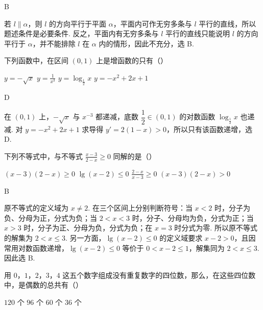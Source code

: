 \begin{answer}
B
\end{answer}

\begin{solution}
若 \(l\parallel\alpha\)，则 \(l\) 的方向平行于平面 \(\alpha\)，平面内可作无穷多条与 \(l\) 平行的直线，所以题述条件是必要条件. 反之，平面内有无穷多条与 \(l\) 平行的直线只能说明 \(l\) 的方向平行于 \(\alpha\)，并不能排除 \(l\) 在 \(\alpha\) 内的情形，因此不充分，选 B.
\end{solution}

\begin{problem}
下列函数中，在区间 \((0,1)\) 上是增函数的只有（\quad）

\choices
    {\(y = -\sqrt{x}\)}
    {\(y = \frac{1}{x^3}\)}
    {\(y = \log_{\frac{1}{2}} x\)}
    {\(y = -x^2 + 2x + 1\)}
\end{problem}

\begin{answer}
D
\end{answer}

\begin{solution}
在 \((0,1)\) 上，\(-\sqrt{x}\) 与 \(x^{-3}\) 都递减，底数 \(\dfrac12\in(0,1)\) 的对数函数 \(\log_{\frac{1}{2}}x\) 也递减. 对 \(y=-x^2+2x+1\) 求导得 \(y'=2(1-x)>0\)，所以只有该函数递增，选 D.
\end{solution}

\begin{problem}
下列不等式中，与不等式 \(\frac{x - 3}{2 - x} \geqslant 0\) 同解的是（\quad）

\choices
    {\((x - 3)(2 - x) \geqslant 0\)}
    {\(\lg(x - 2) \leqslant 0\)}
    {\(\frac{2 - x}{x - 3} \geqslant 0\)}
    {\((x - 3)(2 - x) > 0\)}
\end{problem}

\begin{answer}
B
\end{answer}

\begin{solution}
原不等式的定义域为 \(x\ne2\). 在三个区间上分别判断符号：当 \(x<2\) 时，分子为负、分母为正，分式为负；当 \(2<x<3\) 时，分子、分母均为负，分式为正；当 \(x>3\) 时，分子为正、分母为负，分式为负；在 \(x=3\) 时分式为零. 所以原不等式的解集为 \(2<x\leqslant3\). 另一方面，\(\lg(x-2)\leqslant0\) 的定义域要求 \(x-2>0\)，且因常用对数函数递增，\(\lg(x-2)\leqslant0\) 等价于 \(0<x-2\leqslant1\)，解集同为 \(2<x\leqslant3\). 因此选 B.
\end{solution}

\begin{problem}
用 \(0\)，\(1\)，\(2\)，\(3\)，\(4\) 这五个数字组成没有重复数字的四位数，那么，在这些四位数中，是偶数的总共有（\quad）

\choices
    {\(120\) 个}
    {\(96\) 个}
    {\(60\) 个}
    {\(36\) 个}
\end{problem}

